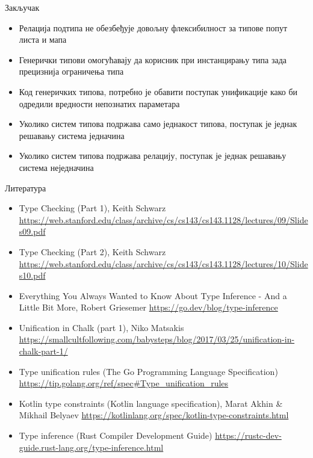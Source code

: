 \documentclass[xcolor=table]{beamer}
\begin{document}
\begin{frame}[allowframebreaks]{Закључак}
        \framebreak
        
        \begin{itemize}
            \item Релација подтипа не обезбеђује довољну флексибилност за типове попут листа и мапа
            \item Генерички типови омогућавају да корисник при инстанцирању типа зада прецизнија ограничења типа
            \item Код генеричких типова, потребно је обавити поступак унификације како би одредили вредности непознатих параметара
            \item Уколико систем типова подржава само једнакост типова, поступак је једнак решавању система једначина
            \item Уколико систем типова подржава релацију, поступак је једнак решавању система неједначина
        \end{itemize}
    \end{frame}
    
    \begin{frame}[allowframebreaks]{Литература}
        \begin{itemize}
            \item Type Checking (Part 1), Keith Schwarz \url{https://web.stanford.edu/class/archive/cs/cs143/cs143.1128/lectures/09/Slides09.pdf}
            \item Type Checking (Part 2), Keith Schwarz \url{https://web.stanford.edu/class/archive/cs/cs143/cs143.1128/lectures/10/Slides10.pdf}
            \item Everything You Always Wanted to Know About Type Inference - And a Little Bit More, Robert Griesemer \url{https://go.dev/blog/type-inference}
            \item Unification in Chalk (part 1), Niko Matsakis \url{https://smallcultfollowing.com/babysteps/blog/2017/03/25/unification-in-chalk-part-1/}
        \end{itemize}
        
        \framebreak
        
        \begin{itemize}
            \item Type unification rules (The Go Programming Language Specification) \url{https://tip.golang.org/ref/spec\#Type_unification_rules}
            \item Kotlin type constraints (Kotlin language specification), Marat Akhin \& Mikhail Belyaev \url{https://kotlinlang.org/spec/kotlin-type-constraints.html}
            \item Type inference (Rust Compiler Development Guide) \url{https://rustc-dev-guide.rust-lang.org/type-inference.html}
        \end{itemize}
    \end{frame}
\end{document}
